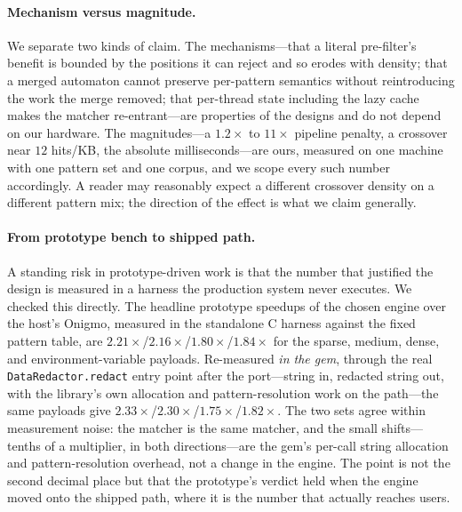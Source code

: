 \documentclass[acmsmall,nonacm,screen]{acmart}
\begin{document}
\paragraph{Mechanism versus magnitude.} We separate two kinds of claim. The
mechanisms---that a literal pre-filter's benefit is bounded by the positions it can
reject and so erodes with density; that a merged automaton cannot preserve
per-pattern semantics without reintroducing the work the merge removed; that
per-thread state including the lazy cache makes the matcher re-entrant---are
properties of the designs and do not depend on our hardware. The magnitudes---a
\(1.2\times\) to \(11\times\) pipeline penalty, a crossover near \(12\) hits/KB,
the absolute milliseconds---are ours, measured on one machine with one pattern set
and one corpus, and we scope every such number accordingly. A reader may reasonably
expect a different crossover density on a different pattern mix; the direction of the
effect is what we claim generally.

\paragraph{From prototype bench to shipped path.} A standing risk in
prototype-driven work is that the number that justified the design is measured in a
harness the production system never executes. We checked this directly. The headline
prototype speedups of the chosen engine over the host's Onigmo, measured in the
standalone C harness against the fixed pattern table, are
\(2.21\times\)/\(2.16\times\)/\(1.80\times\)/\(1.84\times\) for the sparse, medium,
dense, and environment-variable payloads. Re-measured \emph{in the gem}, through the
real \texttt{DataRedactor.redact} entry point after the port---string in, redacted
string out, with the library's own allocation and pattern-resolution work on the
path---the same payloads give \(2.33\times\)/\(2.30\times\)/\(1.75\times\)/\(1.82\times\).
The two sets agree within measurement noise: the matcher is the same matcher, and the
small shifts---tenths of a multiplier, in both directions---are the gem's per-call
string allocation and pattern-resolution overhead, not a change in the engine. The
point is not the second decimal place but that the prototype's verdict held when the
engine moved onto the shipped path, where it is the number that actually reaches users.
\end{document}
